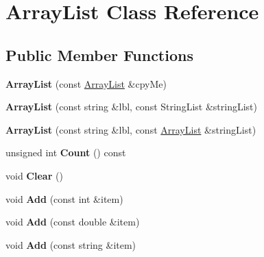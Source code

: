 \hypertarget{classrrc_1_1_array_list}{\section{Array\-List Class Reference}
\label{classrrc_1_1_array_list}
}
\subsection*{Public Member Functions}
\begin{DoxyCompactItemize}
\item 
\hypertarget{classrrc_1_1_array_list_acbb05e3198514df15229385925cf40a3}{{\bfseries Array\-List} (const \hyperlink{classrrc_1_1_array_list}{Array\-List} \&cpy\-Me)}\label{classrrc_1_1_array_list_acbb05e3198514df15229385925cf40a3}

\item 
\hypertarget{classrrc_1_1_array_list_a028aea1c545af53946615c4d5ddba7ca}{{\bfseries Array\-List} (const string \&lbl, const String\-List \&string\-List)}\label{classrrc_1_1_array_list_a028aea1c545af53946615c4d5ddba7ca}

\item 
\hypertarget{classrrc_1_1_array_list_a9c595e9d42b6a4d4e62404c11ef52839}{{\bfseries Array\-List} (const string \&lbl, const \hyperlink{classrrc_1_1_array_list}{Array\-List} \&string\-List)}\label{classrrc_1_1_array_list_a9c595e9d42b6a4d4e62404c11ef52839}

\item 
\hypertarget{classrrc_1_1_array_list_a074f9905a87bb9395d21d9f4bc8c459f}{unsigned int {\bfseries Count} () const }\label{classrrc_1_1_array_list_a074f9905a87bb9395d21d9f4bc8c459f}

\item 
\hypertarget{classrrc_1_1_array_list_aa71d36872f416feaa853788a7a7a7ef8}{void {\bfseries Clear} ()}\label{classrrc_1_1_array_list_aa71d36872f416feaa853788a7a7a7ef8}

\item 
\hypertarget{classrrc_1_1_array_list_a17caac96dcd8cceab22322f020519706}{void {\bfseries Add} (const int \&item)}\label{classrrc_1_1_array_list_a17caac96dcd8cceab22322f020519706}

\item 
\hypertarget{classrrc_1_1_array_list_a5c371a159c312404e83375094cd64e89}{void {\bfseries Add} (const double \&item)}\label{classrrc_1_1_array_list_a5c371a159c312404e83375094cd64e89}

\item 
\hypertarget{classrrc_1_1_array_list_a7526bc6f2a725951f740c5715ad20ec9}{void {\bfseries Add} (const string \&item)}\label{classrrc_1_1_array_list_a7526bc6f2a725951f740c5715ad20ec9}


\end{DoxyCompactItemize}

